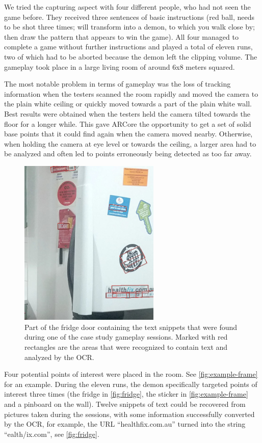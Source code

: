 We tried the capturing aspect with four different people, who had not seen the game before. They received three sentences of basic instructions (red ball, needs to be shot three times; will transform into a demon, to which you walk close by; then draw the pattern that appears to win the game). All four managed to complete a game without further instructions and played a total of eleven runs, two of which had to be aborted because the demon left the clipping volume. The gameplay took place in a large living room of around 6x8 meters squared.

The most notable problem in terms of gameplay was the loss of tracking information when the testers scanned the room rapidly and moved the camera to the plain white ceiling or quickly moved towards a part of the plain white wall. Best results were obtained when the testers held the camera tilted towards the floor for a longer while. This gave ARCore the opportunity to get a set of solid base points that it could find again when the camera moved nearby. Otherwise, when holding the camera at eye level or towards the ceiling, a larger area had to be analyzed and often led to points erroneously being detected as too far away.

\begin{figure}
    \centering
    \includegraphics[height=8cm]{graphics/fridge.png}
    \caption{Part of the fridge door containing the text snippets that were found during one of the case study gameplay sessions. Marked with red rectangles are the areas that were recognized to contain text and analyzed by the OCR.}
    \label{fig:fridge}
\end{figure}

Four potential points of interest were placed in the room. See \autoref{fig:example-frame} for an example. During the eleven runs, the demon specifically targeted points of interest three times (the fridge in \autoref{fig:fridge}, the sticker in \autoref{fig:example-frame} and a pinboard on the wall). 
Twelve snippets of text could be recovered from pictures taken during the sessions, with some information successfully converted by the OCR, for example, the URL \enquote{healthfix.com.au} turned into the string \enquote{ealth/ix.com}, see \autoref{fig:fridge}.

